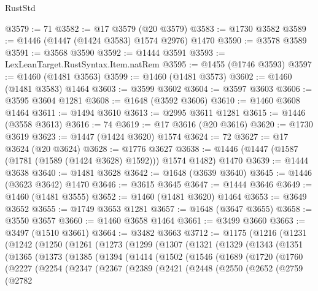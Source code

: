 \begin{lexlean}{RustStd}
\begin{coremodule}
@3579 := 71
@3582 := @17 @3579 (@20 @3579)
@3583 := @1730 @3582
@3589 := @1446 (@1447 (@1424 @3583) @1574 @2976) @1470
@3590 := @3578 @3589
@3591 := @3568 @3590
@3592 := @1444 @3591
@3593 := LexLeanTarget.RustSyntax.Item.natRem
@3595 := @1455 (@1746 @3593)
@3597 := @1460 (@1481 @3563)
@3599 := @1460 (@1481 @3573)
@3602 := @1460 (@1481 @3583) @1464
@3603 := @3599 @3602
@3604 := @3597 @3603
@3606 := @3595 @3604 @1281
@3608 := @1648 (@3592 @3606)
@3610 := @1460 @3608 @1464
@3611 := @1494 @3610
@3613 := @2995 @3611 @1281
@3615 := @1446 (@3558 @3613)
@3616 := 74
@3619 := @17 @3616 (@20 @3616)
@3620 := @1730 @3619
@3623 := @1447 (@1424 @3620) @1574
@3624 := 72
@3627 := @17 @3624 (@20 @3624)
@3628 := @1776 @3627
@3638 := @1446 (@1447 (@1587 (@1781 (@1589 (@1424 @3628) @1592))) @1574 @1482) @1470
@3639 := @1444 @3638
@3640 := @1481 @3628
@3642 := @1648 (@3639 @3640)
@3645 := @1446 (@3623 @3642) @1470
@3646 := @3615 @3645
@3647 := @1444 @3646
@3649 := @1460 (@1481 @3555)
@3652 := @1460 (@1481 @3620) @1464
@3653 := @3649 @3652
@3655 := @1749 @3653 @1281
@3657 := @1648 (@3647 @3655)
@3658 := @3550 @3657
@3660 := @1460 @3658 @1464
@3661 := @3499 @3660
@3663 := @3497 (@1510 @3661)
@3664 := @3482 @3663
@3712 := @1175
    (@1216
      (@1231
        (@1242
          (@1250
            (@1261
              (@1273
                (@1299
                  (@1307
                    (@1321
                      (@1329
                        (@1343
                          (@1351
                            (@1365
                              (@1373
                                (@1385
                                  (@1394
                                    (@1414
                                      (@1502
                                        (@1546
                                          (@1689
                                            (@1720
                                              (@1760
                                                (@2227
                                                  (@2254
                                                    (@2347
                                                      (@2367
                                                        (@2389
                                                          (@2421
                                                            (@2448
                                                              (@2550
                                                                (@2652
                                                                  (@2759
                                                                    (@2782

\end{coremodule}
\end{lexlean}

